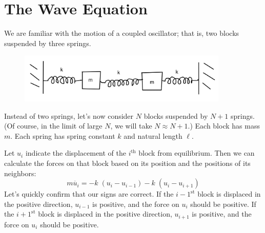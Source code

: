 \documentclass{article}
\begin{document}
\section*{The Wave Equation}

We are familiar with the motion of a coupled oscillator; that is, two blocks suspended by three springs. 

\begin{figure}[h]
\includegraphics[width=10cm]{coupled-oscillators.png}
\centering
\end{figure}

Instead of two springs, let's now consider $N$ blocks suspended by $N+1$ springs. (Of course, in the limit of large $N$, we will take $N\approx N+1$.) Each block has mass $m$. Each spring has spring constant $k$ and natural length $\ell$. 

Let $u_i$ indicate the displacement of the $i^\text{th}$ block from equilibrium. Then we can calculate the forces on that block based on its position and the positions of its neighbors:
$$
m \ddot{u_i} = -k \; \left( u_i - u_{i-1} \right) - k \; \left( u_i - u_{i+1} \right)
$$
Let's quickly confirm that our signs are correct. If the ${i-1}^\text{st}$ block is displaced in the positive direction, $u_{i-1}$ is positive, and the force on $u_i$ should be positive. If the $i+1^\text{st}$ block is displaced in the positive direction, $u_{i+1}$ is positive, and the force on $u_i$ should be positive. 
\end{document}
